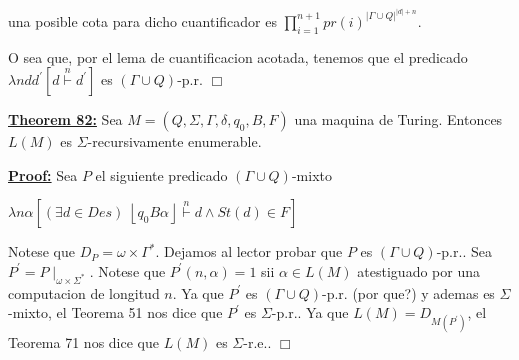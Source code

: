 una posible cota para dicho cuantificador es
\(\displaystyle \prod_{i=1}^{n+1}pr(i)^{\left\vert \Gamma \cup Q\right\vert ^{\left\vert d\right\vert +n}}\text{.} \)

O sea que, por el lema de cuantificacion acotada, tenemos que el predicado \( \lambda ndd^{\prime }\left[ d\overset{n}{\vdash }d^{\prime }\right] \) es \( (\Gamma \cup Q)\)-p.r. \(\Box\)

\textbf{\underline{Theorem 82:}} Sea \(M=\left( Q,\Sigma ,\Gamma ,\delta ,q_{0},B,F\right) \) una maquina de Turing. Entonces \(L(M)\) es \(\Sigma \)-recursivamente enumerable.


\textbf{\underline{Proof:}} Sea \(P\) el siguiente predicado \((\Gamma \cup Q)\)-mixto

\(\displaystyle \lambda n\alpha \left[ (\exists d\in Des)\;\left\lfloor q_{0}B\alpha \right\rfloor \overset{n}{\vdash }d\wedge St(d)\in F\right] \)

Notese que \(D_{P}=\omega \times \Gamma ^{\ast }\). Dejamos al lector probar que \(P\) es \((\Gamma \cup Q)\)-p.r.. Sea \(P^{\prime }=P\mid _{\omega \times \Sigma ^{\ast }}\). Notese que \(P^{\prime }(n,\alpha )=1\) sii \(\alpha \in L(M) \) atestiguado por una computacion de longitud \(n\). Ya que \(P^{\prime }\) es \((\Gamma \cup Q)\)-p.r. (por que?) y ademas es \(\Sigma \)-mixto, el Teorema 51 nos dice que \(P^{\prime }\) es \(\Sigma \)-p.r.. Ya que \( L(M)=D_{M(P^{\prime })}\), el Teorema 71 nos dice que \( L(M)\) es \(\Sigma \)-r.e.. \(\Box\)
